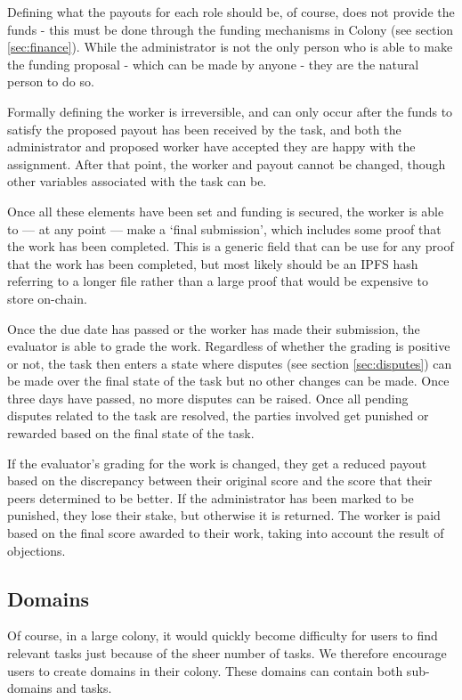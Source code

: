 Defining what the payouts for each role should be, of course, does not provide the funds - this must be done through the funding mechanisms in Colony (see section \ref{sec:finance}). While the administrator is not the only person who is able to make the funding proposal - which can be made by anyone - they are the natural person to do so.

Formally defining the worker is irreversible, and can only occur after the funds to satisfy the proposed payout has been received by the task, and both the administrator and proposed worker have accepted they are happy with the assignment. After that point, the worker and payout cannot be changed, though other variables associated with the task can be.

Once all these elements have been set and funding is secured, the worker is able to --- at any point --- make a ‘final submission’, which includes some proof that the work has been completed. This is a generic field that can be use for any proof that the work has been completed, but most likely should be an IPFS hash referring to a longer file rather than a large proof that would be expensive to store on-chain.

Once the due date has passed or the worker has made their submission, the evaluator is able to grade the work. Regardless of whether the grading is positive or not, the task then enters a state where disputes (see section \ref{sec:disputes}) can be made over the final state of the task but no other changes can be made. Once three days have passed, no more disputes can be raised. Once all pending disputes related to the task are resolved, the parties involved get punished or rewarded based on the final state of the task.

If the evaluator’s grading for the work is changed, they get a reduced payout based on the discrepancy between their original score and the score that their peers determined to be better. If the administrator has been marked to be punished, they lose their stake, but otherwise it is returned. The worker is paid based on the final score awarded to their work, taking into account the result of objections.

\subsection{Domains}\label{sec:domains}

Of course, in a large colony, it would quickly become difficulty for users to find relevant tasks just because of the sheer number of tasks. We therefore encourage users to create domains in their colony. These domains can contain both sub-domains and tasks. 

